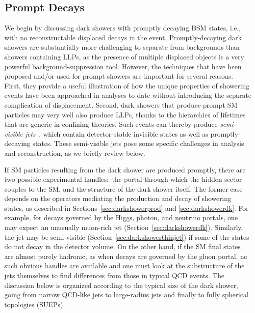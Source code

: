 \subsection{Prompt Decays}
\label{sec:darkshowerprompt}

We begin by discussing dark showers with promptly decaying BSM states, i.e., with no reconstructable displaced decays in the event. Promptly-decaying dark showers are substantially more challenging to separate from backgrounds than showers containing LLPs, as the presence of multiple displaced objects is a very powerful background-suppression tool. However, the techniques that have been proposed and/or used for prompt showers are important for several reasons. First, they provide a useful illustration of how the unique properties of showering events have been approached in analyses to date without introducing the separate complication of displacement. Second, dark showers that produce prompt SM particles may very well also produce LLPs, thanks to the hierarchies of lifetimes that are generic in confining theories.  Such events can thereby produce {\em semi-visible jets}~\cite{Cohen:2015toa}, which contain detector-stable invisible states as well as promptly-decaying states. These semi-visible jets pose some specific challenges in analysis and reconstruction, as we briefly review below.

If SM particles resulting from the dark shower are produced promptly, there are two possible experimental handles:~the portal through which the hidden sector couples to the SM, and the structure of the dark shower itself.
The former case  depends on the operators mediating the production and decay of showering states, as described in Sections~\ref{sec:darkshowerprod} and \ref{sec:darkshowerdk}.
For example, for decays governed by the Higgs, photon, and neutrino portals, one may expect an unusually muon-rich jet (Section~\ref{sec:darkshowerdk}). Similarly, the jet may be semi-visible (Section~\ref{sec:darkshowerthinjet}) if some of the states do not decay in the detector volume. On the other hand, if the SM final states are almost purely hadronic, as when decays are governed by the gluon portal, no such obvious handles are available and one must look at the substructure of the jets themselves to find differences from those in typical QCD events. The discussion below is organized according to the typical size of the dark shower, going from narrow QCD-like jets to large-radius jets and finally to fully spherical topologies (SUEPs).

